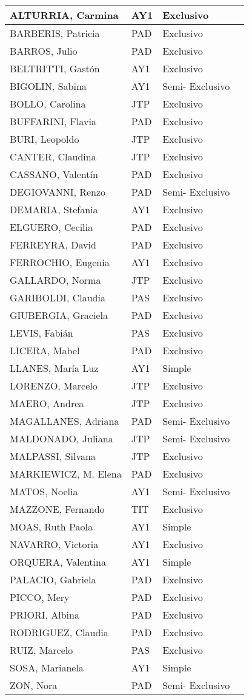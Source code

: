 \documentclass[a4paper, 12pt]{article}
\begin{document}
\begin{xltabular}{1\textwidth}{|l|l|l|l|}
ALTURRIA, Carmina&AY1& Exclusivo\\ \hline
BARBERIS, Patricia&PAD&Exclusivo\\ \hline
BARROS, Julio&PAD&Exclusivo\\ \hline
BELTRITTI, Gastón&AY1&Exclusivo\\ \hline
BIGOLIN, Sabina&AY1&Semi- Exclusivo\\ \hline
BOLLO, Carolina&JTP&Exclusivo\\ \hline
BUFFARINI, Flavia&PAD&Exclusivo\\ \hline
BURI, Leopoldo&JTP&Exclusivo\\ \hline
CANTER, Claudina&JTP&Exclusivo\\ \hline
CASSANO, Valentín&PAD&Exclusivo\\ \hline
DEGIOVANNI, Renzo&PAD&Semi- Exclusivo\\ \hline
DEMARIA, Stefania&AY1& Exclusivo\\ \hline
ELGUERO, Cecilia&PAD&Exclusivo\\ \hline
FERREYRA, David&PAD&Exclusivo\\ \hline
FERROCHIO, Eugenia&AY1& Exclusivo\\ \hline
GALLARDO, Norma&JTP&Exclusivo\\ \hline
GARIBOLDI, Claudia&PAS&Exclusivo\\ \hline
GIUBERGIA, Graciela&PAD&Exclusivo\\ \hline
LEVIS, Fabián&PAS&Exclusivo\\ \hline
LICERA, Mabel&PAD&Exclusivo\\ \hline
LLANES, María Luz&AY1&Simple\\ \hline
LORENZO, Marcelo&JTP&Exclusivo\\ \hline
MAERO, Andrea&JTP&Exclusivo\\ \hline
MAGALLANES, Adriana&PAD&Semi- Exclusivo\\ \hline
MALDONADO, Juliana&JTP&Semi- Exclusivo\\ \hline
MALPASSI, Silvana&JTP&Exclusivo\\ \hline
MARKIEWICZ, M. Elena&PAD&Exclusivo\\ \hline
MATOS, Noelia&AY1&Semi- Exclusivo\\ \hline
MAZZONE, Fernando&TIT&Exclusivo\\ \hline
MOAS, Ruth Paola&AY1&Simple\\ \hline
NAVARRO, Victoria&AY1& Exclusivo\\ \hline
ORQUERA, Valentina&AY1&Simple\\ \hline
PALACIO, Gabriela&PAD&Exclusivo\\ \hline
PICCO, Mery&PAD&Exclusivo\\ \hline
PRIORI, Albina&PAD&Exclusivo\\ \hline
RODRIGUEZ, Claudia&PAD&Exclusivo\\ \hline
RUIZ, Marcelo&PAS&Exclusivo\\ \hline
SOSA, Marianela&AY1&Simple\\ \hline
ZON, Nora&PAD&Semi- Exclusivo\\ \hline

\end{xltabular}
\end{document}
